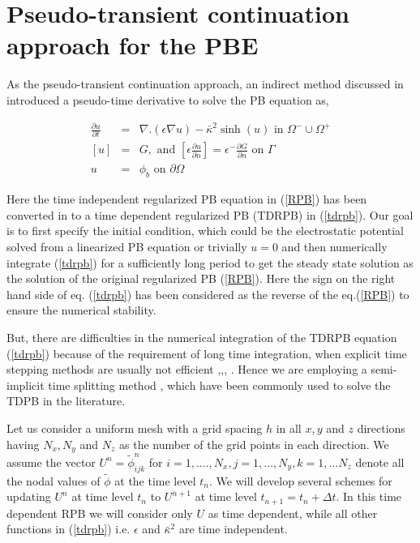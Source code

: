 \section{Pseudo-transient continuation approach for the PBE}

As the pseudo-transient continuation approach, an indirect method discussed in \cite{zhao_pseudo-time-coupled_2011,Sayyed-Ahmad2004,shestakov_solution_2002} introduced a pseudo-time derivative to solve the PB equation as,  

\begin{eqnarray}
	 	\frac{\partial u}{\partial t} &=& \nabla.(\epsilon \nabla u)-\bar\kappa^2 \sinh(u) \text{ in } \Omega^- \cup \Omega^+ \label{tdrpb} \\
	 	  \left[u\right]&=& G,\text{ and } \left[\epsilon\frac{\partial u}{\partial n}\right]= \epsilon^-  \frac{\partial G}{\partial n} \text{ on } \Gamma\\ \label{jump}
	 	  u&=&\phi_b \text{ on } \partial \Omega
	\end{eqnarray}

Here the time independent regularized PB equation in (\ref{RPB}) has been converted in to a time dependent regularized PB (TDRPB) in (\ref{tdrpb}). Our goal is to first specify the initial condition, which could be the electrostatic potential solved from a linearized PB \cite{zhao_pseudo-time-coupled_2011} equation or trivially $u = 0$ and then numerically integrate (\ref{tdrpb}) for a sufficiently long period to get the steady state solution as the solution of the original regularized PB (\ref{RPB}). Here the sign on the right hand side of eq. (\ref{tdrpb}) has been considered as the reverse of the eq.(\ref{RPB}) to ensure the numerical stability. 

But, there are difficulties in the numerical integration of the TDRPB equation (\ref{tdrpb}) because of the requirement of long time integration, when explicit time stepping methods are usually not efficient \cite{Sayyed-Ahmad2004},\cite{shestakov_solution_2002},\cite{zhao_pseudo-time-coupled_2011}, \cite{zhao_operator_2014}. Hence we are employing a semi-implicit time splitting method \cite{Sayyed-Ahmad2004},\cite{shestakov_solution_2002} which have been commonly used to solve the TDPB in the literature. 

Let us consider a uniform mesh with a grid spacing $h$ in all $x,y$ and $z$ directions having $N_x,N_y$ and $N_z$ as the number of the grid points in each direction. We assume the vector $U^n={\tilde\phi^n_{ijk}}$ for $i=1,...., N_x,j=1,...,N_y,k=1,...N_z$ denote all the nodal values of $\tilde\phi$ at the time level $t_n$. We will develop several schemes for updating $U^n$ at time level $t_n$ to $U^{n+1}$ at time level $t_{n+1}=t_n+ \Delta t $. In this time dependent RPB we will consider only $U$ as time dependent, while all other functions in (\ref{tdrpb}) i.e. $\epsilon$ and $\bar\kappa^2 $ are time independent. 

